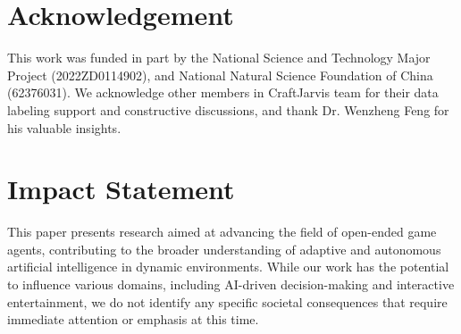 \documentclass{article} %
\begin{document}


% 







\section*{Acknowledgement}
This work was funded in part by the National Science and Technology Major Project (2022ZD0114902), and National Natural Science Foundation of China (62376031).
We acknowledge other members in CraftJarvis team for their data labeling support and constructive discussions, and thank Dr. Wenzheng Feng for his valuable insights. 

\section*{Impact Statement}
This paper presents research aimed at advancing the field of open-ended game agents, contributing to the broader understanding of adaptive and autonomous artificial intelligence in dynamic environments. While our work has the potential to influence various domains, including AI-driven decision-making and interactive entertainment, we do not identify any specific societal consequences that require immediate attention or emphasis at this time.






\appendix
\onecolumn


\end{document}
